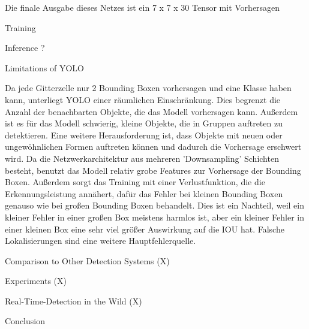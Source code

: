 {\begin{list}{-}{Quelle: \citet{Plastiras2018}}
				\item Die finale Ausgabe dieses Netzes ist ein 7 x 7 x 30 Tensor mit Vorhersagen
			\item Training 
			\item Inference ?
			\item Limitations of YOLO
				\item Da jede Gitterzelle nur 2 Bounding Boxen vorhersagen und eine Klasse haben kann, unterliegt YOLO einer räumlichen Einschränkung. Dies begrenzt die Anzahl der benachbarten Objekte, die das Modell vorhersagen kann. Außerdem ist es für das Modell schwierig, kleine Objekte, die in Gruppen auftreten zu detektieren. Eine weitere Herausforderung ist, dass Objekte mit neuen oder ungewöhnlichen Formen auftreten können und dadurch die Vorhersage erschwert wird. Da die Netzwerkarchitektur aus mehreren 'Downsampling' Schichten besteht, benutzt das Modell relativ grobe Features zur Vorhersage der Bounding Boxen. Außerdem sorgt das Training mit einer Verlustfunktion, die die Erkennungsleistung annähert, dafür das Fehler bei kleinen Bounding Boxen genauso wie bei großen Bounding Boxen behandelt. Dies ist ein Nachteil, weil ein kleiner Fehler in einer großen Box meistens harmlos ist, aber ein kleiner Fehler in einer kleinen Box eine sehr viel größer Auswirkung auf die IOU hat. Falsche Lokalisierungen sind eine weitere Hauptfehlerquelle.
				\item  
		\item Comparison to Other Detection Systems (X)
		\item Experiments (X)
		\item Real-Time-Detection in the Wild (X)
		\item Conclusion
	\end{list}
	
}



